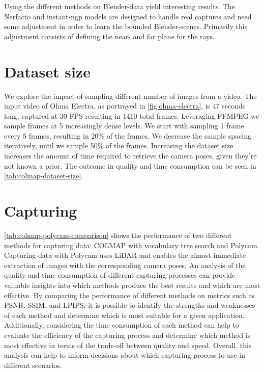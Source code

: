 Using the different methods on Blender-data yield interesting results. The Nerfacto and instant-ngp models are designed to handle real captures and need some adjustment in order to learn the bounded Blender-scenes. Primarily this adjustment consists of defining the near- and far plane for the rays.



\section{Dataset size}
We explore the impact of sampling different number of images from a video. The input video of Ohma Electra, as portrayed in \autoref{fig:ohma-electra}, is 47 seconds long, captured at 30 FPS resulting in 1410 total frames. Leveraging FFMPEG we sample frames at 5 increasingly dense levels. We start with sampling 1 frame every 5 frames, resulting in 20\% of the frames. We decrease the sample spacing iteratively, until we sample 50\% of the frames. Increasing the dataset size increases the amount of time required to retrieve the camera poses, given they're not known a prior. The outcome in quality and time consumption can be seen in \autoref{tab:colmap-dataset-size}.




\section{Capturing}
\autoref{tab:colmap-polycam-comparison} shows the performance of two different methods for capturing data: COLMAP with vocabulary tree search and Polycam. Capturing data with Polycam uses LiDAR and enables the almost immediate extraction of images with the corresponding camera poses. An analysis of the quality and time consumption of different capturing processes can provide valuable insights into which methods produce the best results and which are most effective. By comparing the performance of different methods on metrics such as PSNR, SSIM, and LPIPS, it is possible to identify the strengths and weaknesses of each method and determine which is most suitable for a given application. Additionally, considering the time consumption of each method can help to evaluate the efficiency of the capturing process and determine which method is most effective in terms of the trade-off between quality and speed. Overall, this analysis can help to inform decisions about which capturing process to use in different scenarios.

